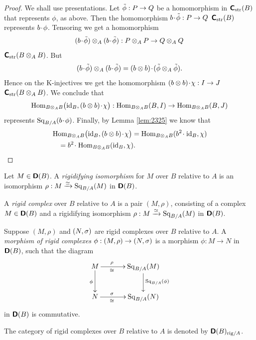 \begin{proof}
We shall use presentations. Let 
$\tilde{\phi} : P \to Q$ be a homomorphism in $\boldsymbol{\mathsf{C}}_{\mathrm{str}}(B)$
that represents $\phi$, as above. Then the homomorphism
$b \mspace{1.5mu}{\cdot}\mspace{1.5mu} \tilde{\phi} : P \to Q$ 
$\boldsymbol{\mathsf{C}}_{\mathrm{str}}(B)$ represents $b \mspace{1.5mu}{\cdot}\mspace{1.5mu} \phi$.
Tensoring we get a homomorphism
\[ (b \mspace{1.5mu}{\cdot}\mspace{1.5mu} \tilde{\phi}) \otimes_A (b \mspace{1.5mu}{\cdot}\mspace{1.5mu} \tilde{\phi}) : 
P \otimes_A P \to Q \otimes_A Q \]
$\boldsymbol{\mathsf{C}}_{\mathrm{str}}(B \otimes_A B)$.
But 
\[ (b \mspace{1.5mu}{\cdot}\mspace{1.5mu} \tilde{\phi}) \otimes_A (b \mspace{1.5mu}{\cdot}\mspace{1.5mu} \tilde{\phi}) = 
(b \otimes b) \mspace{1.5mu}{\cdot}\mspace{1.5mu} (\tilde{\phi} \otimes_A \tilde{\phi}) . \]
Hence on the K-injectives we get the homomorphism
$(b \otimes b) \mspace{1.5mu}{\cdot}\mspace{1.5mu} \chi : I \to  J$ 
$\boldsymbol{\mathsf{C}}_{\mathrm{str}}(B \otimes_A B)$.  We conclude that 
\[ \operatorname{Hom}_{B \otimes_{A} B} \bigl( \operatorname{id}_B, (b \otimes b) \mspace{1.5mu}{\cdot}\mspace{1.5mu} \chi \bigr) : 
\operatorname{Hom}_{B \otimes_{A} B}(B, I) \to 
\operatorname{Hom}_{B \otimes_{A} B}(B, J) \]
represents 
$\operatorname{Sq}_{B / A}(b \mspace{1.5mu}{\cdot}\mspace{1.5mu} \phi)$. Finally, by Lemma \ref{lem:2325} 
we know that 
\[ \begin{aligned}
& \operatorname{Hom}_{B \otimes_{A} B} \bigl( \operatorname{id}_B, (b \otimes b) \mspace{1.5mu}{\cdot}\mspace{1.5mu} \chi \bigr) = 
\operatorname{Hom}_{B \otimes_{A} B}(b^2 \mspace{1.5mu}{\cdot}\mspace{1.5mu} \operatorname{id}_B, \chi) 
\\
& \quad = b^2 \mspace{1.5mu}{\cdot}\mspace{1.5mu}  \operatorname{Hom}_{B \otimes_{A} B}(\operatorname{id}_B, \chi) . 
\end{aligned} \]
\end{proof}

\begin{dfn} \label{dfn:2276} 
Let $M \in \boldsymbol{\mathsf{D}}(B)$. 
A {\em rigidifying isomorphism} 
for $M$ over $B$ 
relative to $A$ is an isomorphism 
$\rho : M \xrightarrow{\simeq} \operatorname{Sq}_{B / A}(M)$
in $\boldsymbol{\mathsf{D}}(B)$. 
\end{dfn}

\begin{dfn} \label{dfn:2295}
A {\em rigid complex} 
over $B$ relative to $A$ is a pair 
$(M, \rho)$, consisting of a complex $M \in \boldsymbol{\mathsf{D}}(B)$ 
and a rigidifying isomorphism 
$\rho : M \xrightarrow{\simeq} \operatorname{Sq}_{B / A}(M)$
in $\boldsymbol{\mathsf{D}}(B)$. 
\end{dfn}

\begin{dfn} \label{dfn:2296}
Suppose $(M, \rho)$ and $(N, \sigma)$ are rigid complexes over $B$ relative 
to $A$. A {\em morphism of rigid complexes}
$\phi : (M, \rho) \to (N, \sigma)$ 
is a morphism $\phi : M \to N$ in $\boldsymbol{\mathsf{D}}(B)$, such that the diagram 
\[ \UseTips \xymatrix @C=8ex @R=6ex {
M
\ar[r]^(0.35){\rho}_(0.35){\cong}
\ar[d]_{\phi}
&
\opn{Sq}_{B / A}(M)
\ar[d]^{\opn{Sq}_{B / A}(\phi)}
\\
N
\ar[r]^(0.35){\si}_(0.35){\cong}
&
\opn{Sq}_{B / A}(N)
} \]
in $\boldsymbol{\mathsf{D}}(B)$ is commutative. 

The category of rigid complexes over $B$ relative to $A$ is denoted by
$\boldsymbol{\mathsf{D}}(B)_{\mathrm{rig} / A}$. 
\end{dfn}

